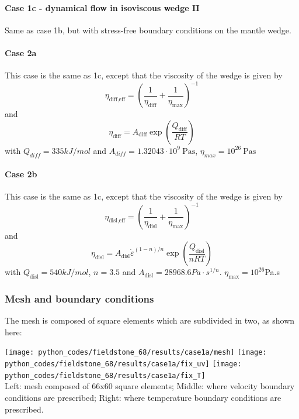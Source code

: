 \paragraph{Case 1c - dynamical flow in isoviscous wedge II} 
Same as case 1b, but with stress-free boundary conditions on the mantle wedge.

\paragraph{Case 2a}

This case is the same as 1c, except that the viscosity of the wedge
is given by 
\[
\eta_{\text{diff,eff}} = \left( \frac{1}{\eta_{\text{diff}}} + \frac{1}{\eta_{\text{max}}} \right)^{-1}
\]
and
\[
\eta_{\text{diff}}=A_{\text{diff}} \exp\left( \frac{Q_{\text{diff}}}{RT} \right)
\]
with
$Q_{diff}=335kJ/mol$ and $A_{diff}=1.32043 \cdot 10^9~\si{\pascal\second}$,  
$\eta_{max}=10^{26}~\si{\pascal\second}$

\paragraph{Case 2b}

This case is the same as 1c, except that the viscosity of the wedge
is given by 
\[
\eta_{\text{disl,eff}} = \left( \frac{1}{\eta_{\text{disl}}} + \frac{1}{\eta_{\text{max}}} \right)^{-1}
\]
and
\[
\eta_{\text{disl}}=
A_{\text{disl}} \dot\varepsilon^{(1-n)/n} \exp \left( \frac{Q_{\text{disl}}}{nRT} \right)
\]
with $Q_{\text{disl}}=540kJ/mol$, $n=3.5$ and $A_{\text{disl}}=28968.6Pa\cdot s^{1/n}$. 
$\eta_{\text{max}}=10^{26}$Pa.s


\subsubsection*{Mesh and boundary conditions}

The mesh is composed of square elements which are subdivided in two, as shown here:

\begin{center}
\texttt{[image: python\_codes/fieldstone\_68/results/case1a/mesh]}
\texttt{[image: python\_codes/fieldstone\_68/results/case1a/fix\_uv]}
\texttt{[image: python\_codes/fieldstone\_68/results/case1a/fix\_T]}\\
{\captionfont Left: mesh composed of 66x60 square elements; 
Middle: where velocity boundary conditions are prescribed;
Right: where temperature boundary conditions are prescribed.}
\end{center}

